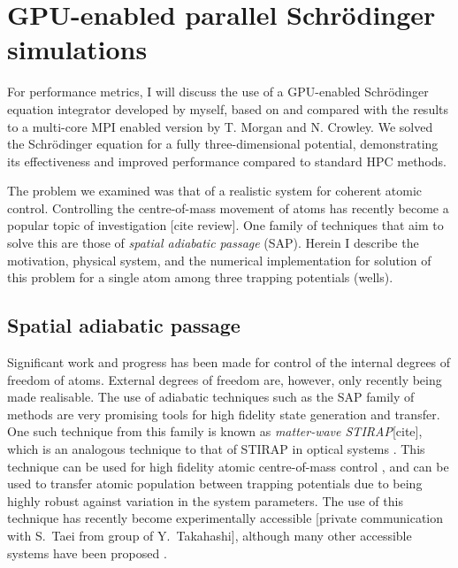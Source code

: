 \section{GPU-enabled parallel Schr\"odinger simulations}
\label{sec:3D Stirap parallel Schr\"odinger simulations}
For performance metrics, I will discuss the use of a GPU-enabled Schr\"odinger equation integrator developed by myself, based on and compared with the results to a multi-core MPI enabled version by T. Morgan and N. Crowley. We solved the Schr\"odinger equation for a fully three-dimensional potential, demonstrating its effectiveness and improved performance compared to standard HPC methods.

The problem we examined was that of a realistic system for coherent atomic control. Controlling the centre-of-mass movement of atoms has recently become a popular topic of investigation [cite review]. One family of techniques that aim to solve this are those of \textit{spatial adiabatic passage} (SAP). Herein I describe the motivation, physical system, and the numerical implementation for solution of this problem for a single atom among three trapping potentials (wells).

\subsection{Spatial adiabatic passage}

Significant work and progress has been made for control of the internal degrees of freedom of atoms. External degrees of freedom are, however, only recently being made realisable. The use of adiabatic techniques such as the SAP family of methods are very promising tools for high fidelity state generation and transfer. One such technique from this family is known as \textit{matter-wave STIRAP}[cite], which is an analogous technique to that of STIRAP in optical systems \cite{}. This technique can be used for high fidelity atomic centre-of-mass control \cite{Eckert:04}, and can be used to transfer atomic population between trapping potentials due to being highly robust against variation in the system parameters. The use of this technique has recently become experimentally accessible [private communication with S.~Taei from group of Y.~Takahashi], although many other accessible systems have been proposed \cite{Eckert:06,Morgan:11,Kohler:13}.


